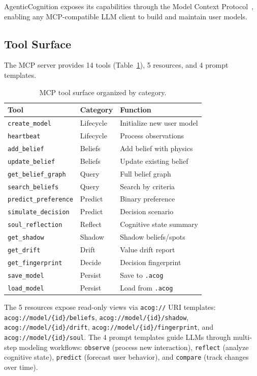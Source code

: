 \documentclass[10pt, twocolumn]{article}
\begin{document}
AgenticCognition exposes its capabilities through the Model Context Protocol~\cite{mcp2024}, enabling any MCP-compatible LLM client to build and maintain user models.

\subsection{Tool Surface}
\label{sec:tools}

The MCP server provides 14 tools (Table~\ref{tab:tools}), 5 resources, and 4 prompt templates.

\begin{table}[t]
\centering
\caption{MCP tool surface organized by category.}
\label{tab:tools}
\footnotesize
\begin{tabular}{llp{2.4cm}}
\toprule
\textbf{Tool} & \textbf{Category} & \textbf{Function} \\
\midrule
\texttt{create\_model} & Lifecycle & Initialize new user model \\
\texttt{heartbeat} & Lifecycle & Process observations \\
\texttt{add\_belief} & Beliefs & Add belief with physics \\
\texttt{update\_belief} & Beliefs & Update existing belief \\
\texttt{get\_belief\_graph} & Query & Full belief graph \\
\texttt{search\_beliefs} & Query & Search by criteria \\
\texttt{predict\_preference} & Predict & Binary preference \\
\texttt{simulate\_decision} & Predict & Decision scenario \\
\texttt{soul\_reflection} & Reflect & Cognitive state summary \\
\texttt{get\_shadow} & Shadow & Shadow beliefs/spots \\
\texttt{get\_drift} & Drift & Value drift report \\
\texttt{get\_fingerprint} & Decide & Decision fingerprint \\
\texttt{save\_model} & Persist & Save to \texttt{.acog} \\
\texttt{load\_model} & Persist & Load from \texttt{.acog} \\
\bottomrule
\end{tabular}
\end{table}

The 5 resources expose read-only views via \texttt{acog://} URI templates: \texttt{acog://model/\{id\}/beliefs}, \texttt{acog://model/\{id\}/shadow}, \texttt{acog://model/\{id\}/drift}, \texttt{acog://model/\{id\}/fingerprint}, and \texttt{acog://model/\{id\}/soul}. The 4 prompt templates guide LLMs through multi-step modeling workflows: \texttt{observe} (process new interaction), \texttt{reflect} (analyze cognitive state), \texttt{predict} (forecast user behavior), and \texttt{compare} (track changes over time).
\end{document}
